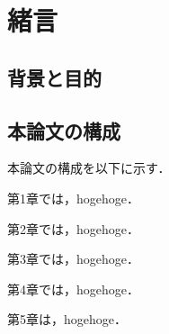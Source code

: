 \documentclass[/workdir/src/main.tex]{subfiles}
\begin{document}
\ifSubfilesClassLoaded{%
  \setcounter{section}{0}
}{}

\section{緒言}

\subsection{背景と目的}

\subsection{本論文の構成}
      
本論文の構成を以下に示す．

第1章では，hogehoge．

第2章では，hogehoge．

第3章では，hogehoge．

第4章では，hogehoge．

第5章は，hogehoge．

\ifSubfilesClassLoaded{%
  \clearpage%
}{}
\end{document}
